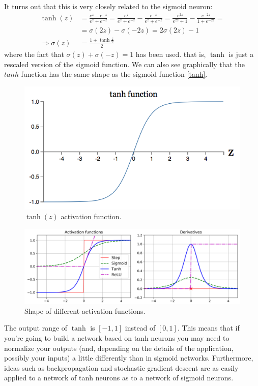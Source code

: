 \documentclass[12pt, letterpaper]{article}
\theoremstyle{definition}
\begin{document}
It turns out that this is very closely related to the sigmoid neuron: 
\begin{equation}
\begin{aligned}
\tanh(z) &= \frac{e^z - e^{-z}}{e^z + e^{-z}} = \frac{e^z }{e^z + e^{-z}} - \frac{ e^{-z}}{e^z + e^{-z}}= \frac{e^{2z} }{e^{2z} + 1} - \frac{ e^{-2z}}{1 + e^{-2z}} = \\ &=\sigma(2z) - \sigma(-2z) = 2\sigma(2z) - 1\\
\Rightarrow\sigma(z) &= \frac{1+\tanh{\frac{z}{2}}}{2}
\end{aligned}
\end{equation}
where the fact that $\sigma(z) + \sigma(-z) = 1$ has been used.
that is, $\tanh$ is just a rescaled version of the sigmoid function. We can also see graphically that the $tanh$ function has the same shape as the sigmoid function \autoref{tanh}.
 \begin{figure}
\centering
 \includegraphics[scale=0.6]{img/tanh}
 \caption{$\tanh(z)$ activation function.}
 \label{tanh}
 \end{figure}
 \begin{figure}
\includegraphics[scale=0.4]{img/activationFunctions}
\caption{Shape of different activation functions.}
\label{activationFunctions}
\end{figure}
 The output range of $\tanh$ is $[-1,1]$ instead of $[0,1]$. This means that if you're going to build a network based on tanh neurons you may need to normalize your outputs (and, depending on the details of the application, possibly your inputs) a little differently than in sigmoid networks. Furthermore, ideas such as backpropagation and stochastic gradient descent are as easily applied to a network of tanh neurons as to a network of sigmoid neurons.
 
\end{document}
